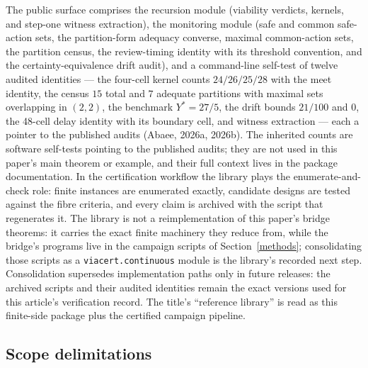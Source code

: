 \documentclass[10pt,twocolumn]{article}
\theoremstyle{plain}
\theoremstyle{definition}
\theoremstyle{remark}
\begin{document}
The public surface comprises the recursion module (viability verdicts,
kernels, and step-one witness extraction), the monitoring module (safe and
common safe-action sets, the partition-form adequacy converse, maximal
common-action sets, the partition census, the review-timing identity with
its threshold convention, and the certainty-equivalence drift audit), and a
command-line self-test of twelve audited identities --- the four-cell kernel
counts \(24/26/25/28\) with the meet identity, the census \(15\) total and
\(7\) adequate partitions with maximal sets overlapping in \((2,2)\), the
benchmark \(Y^{*} = 27/5\), the drift bounds \(21/100\) and \(0\), the
48-cell delay identity with its boundary cell, and witness extraction ---
each a pointer to the published audits (Abaee, 2026a, 2026b). The
inherited counts are software self-tests pointing to the published audits;
they are not used in this paper's main theorem or example, and their full
context lives in the package documentation. In the certification workflow
the library plays the enumerate-and-check role:
finite instances are enumerated exactly, candidate designs are tested
against the fibre criteria, and every claim is archived with the script that
regenerates it. The library is not a reimplementation of this paper's bridge theorems: it carries the exact finite machinery they reduce from, while the bridge's programs live in the campaign scripts of Section~\ref{methods}; consolidating those scripts as a \texttt{viacert.continuous} module is the library's recorded next step. Consolidation supersedes implementation paths only in future releases:
the archived scripts and their audited identities remain the exact versions
used for this article's verification record. The title's ``reference
library'' is read as this finite-side package plus the certified campaign
pipeline.

\subsection{Scope delimitations}\label{scope}
\end{document}

